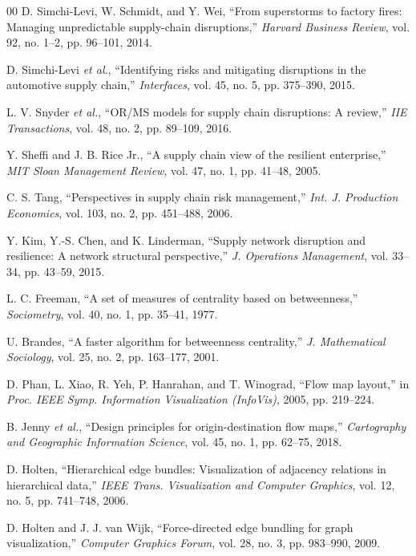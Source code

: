 \documentclass[conference]{IEEEtran}
\begin{document}
\begin{thebibliography}{00}
 D. Simchi-Levi, W. Schmidt, and Y. Wei, ``From
superstorms to factory fires: Managing unpredictable supply-chain
disruptions,'' \textit{Harvard Business Review}, vol. 92, no. 1--2,
pp. 96--101, 2014.

 D. Simchi-Levi \textit{et al.}, ``Identifying
risks and mitigating disruptions in the automotive supply chain,''
\textit{Interfaces}, vol. 45, no. 5, pp. 375--390, 2015.

 L. V. Snyder \textit{et al.}, ``OR/MS models for
supply chain disruptions: A review,'' \textit{IIE Transactions}, vol. 48,
no. 2, pp. 89--109, 2016.

 Y. Sheffi and J. B. Rice Jr., ``A supply chain view
of the resilient enterprise,'' \textit{MIT Sloan Management Review},
vol. 47, no. 1, pp. 41--48, 2005.

 C. S. Tang, ``Perspectives in supply chain risk
management,'' \textit{Int. J. Production Economics}, vol. 103, no. 2,
pp. 451--488, 2006.

 Y. Kim, Y.-S. Chen, and K. Linderman, ``Supply network
disruption and resilience: A network structural perspective,''
\textit{J. Operations Management}, vol. 33--34, pp. 43--59, 2015.

 L. C. Freeman, ``A set of measures of centrality
based on betweenness,'' \textit{Sociometry}, vol. 40, no. 1, pp. 35--41,
1977.

 U. Brandes, ``A faster algorithm for betweenness
centrality,'' \textit{J. Mathematical Sociology}, vol. 25, no. 2,
pp. 163--177, 2001.

 D. Phan, L. Xiao, R. Yeh, P. Hanrahan, and
T. Winograd, ``Flow map layout,'' in \textit{Proc. IEEE Symp. Information
Visualization (InfoVis)}, 2005, pp. 219--224.

 B. Jenny \textit{et al.}, ``Design principles for
origin-destination flow maps,'' \textit{Cartography and Geographic
Information Science}, vol. 45, no. 1, pp. 62--75, 2018.

 D. Holten, ``Hierarchical edge bundles:
Visualization of adjacency relations in hierarchical data,''
\textit{IEEE Trans. Visualization and Computer Graphics}, vol. 12, no. 5,
pp. 741--748, 2006.

 D. Holten and J. J. van Wijk, ``Force-directed edge
bundling for graph visualization,'' \textit{Computer Graphics Forum},
vol. 28, no. 3, pp. 983--990, 2009.


\end{thebibliography}
\end{document}
